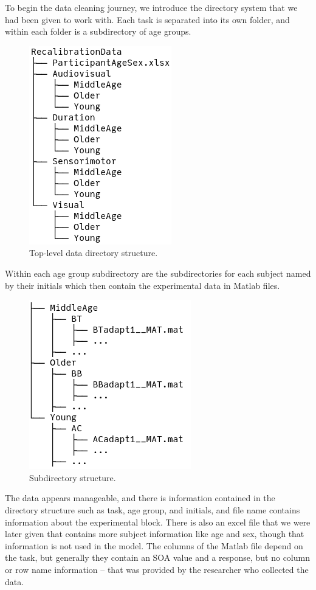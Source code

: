 \documentclass[11pt, oneside, openany]{scrbook}
\begin{document}
To begin the data cleaning journey, we introduce the directory system that we had been given to work with. Each task is separated into its own folder, and within each folder is a subdirectory of age groups.

\begin{figure}

{\centering \includegraphics[width=0.3\linewidth]{figures/data_dir} 

}

\caption{Top-level data directory structure.}\label{fig:ch230-Lama-Everyday}
\end{figure}

Within each age group subdirectory are the subdirectories for each subject named by their initials which then contain the experimental data in Matlab files.

\begin{figure}

{\centering \includegraphics[width=0.35\linewidth]{figures/data_subdir} 

}

\caption{Subdirectory structure.}\label{fig:ch230-Third-Needless-Antique}
\end{figure}

The data appears manageable, and there is information contained in the directory structure such as task, age group, and initials, and file name contains information about the experimental block. There is also an excel file that we were later given that contains more subject information like age and sex, though that information is not used in the model. The columns of the Matlab file depend on the task, but generally they contain an SOA value and a response, but no column or row name information -- that was provided by the researcher who collected the data.
\end{document}
